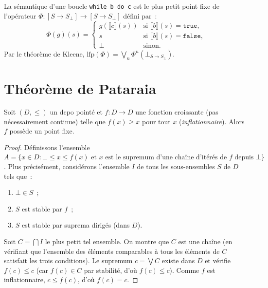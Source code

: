 \begin{exemple}
La s\'emantique d'une boucle \texttt{while b do c} est le plus petit point fixe de
l'op\'erateur $\Phi\colon [S \to S_\bot] \to [S \to S_\bot]$ d\'efini par~:
\[
  \Phi(g)(s) = \begin{cases}
    g(\llbracket c \rrbracket(s)) & \text{si } \llbracket b \rrbracket(s) = \mathtt{true}, \\
    s & \text{si } \llbracket b \rrbracket(s) = \mathtt{false}, \\
    \bot & \text{sinon}.
  \end{cases}
\]
Par le th\'eor\`eme de Kleene, $\mathrm{lfp}(\Phi) = \bigvee_n \Phi^n(\bot_{S \to S_\bot})$.
\end{exemple}

\section{Th\'eor\`eme de Pataraia}

\begin{theoreme}[Pataraia]
\label{thm:pataraia}
Soit $(D, \leq)$ un dcpo point\'e et $f\colon D \to D$ une fonction croissante (pas
n\'ecessairement continue) telle que $f(x) \geq x$ pour tout $x$ (\emph{inflationnaire}).
Alors $f$ poss\`ede un point fixe.
\end{theoreme}

\begin{proof}
D\'efinissons l'ensemble $A = \{ x \in D : \bot \leq x \leq f(x) \text{ et } x \text{ est
le supremum d'une cha\^ine d'it\'er\'es de } f \text{ depuis } \bot \}$. Plus
pr\'ecis\'ement, consid\'erons l'ensemble $I$ de tous les sous-ensembles $S$ de $D$ tels
que~:
\begin{enumerate}
  \item $\bot \in S$~;
  \item $S$ est stable par $f$~;
  \item $S$ est stable par suprema dirig\'es (dans $D$).
\end{enumerate}
Soit $C = \bigcap I$ le plus petit tel ensemble. On montre que $C$ est une cha\^ine (en
v\'erifiant que l'ensemble des \'el\'ements comparables \`a tous les \'el\'ements de $C$
satisfait les trois conditions). Le supremum $c = \bigvee C$ existe dans $D$ et v\'erifie
$f(c) \leq c$ (car $f(c) \in C$ par stabilit\'e, d'o\`u $f(c) \leq c$). Comme $f$ est
inflationnaire, $c \leq f(c)$, d'o\`u $f(c) = c$.
\end{proof}

